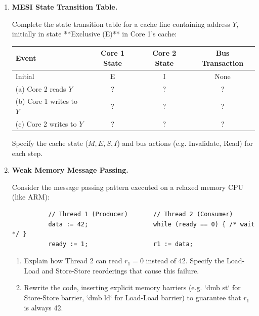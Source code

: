 \documentclass[12pt, a4paper]{book}
\begin{document}
\begin{problembox}
\begin{enumerate}[label=\textbf{P\arabic*.}]
  \item \textbf{MESI State Transition Table.}
  
        Complete the state transition table for a cache line containing address $Y$, initially in state **Exclusive (E)** in Core 1's cache:
        \begin{center}
        \begin{tabular}{lccc}
          \toprule
          \textbf{Event} & \textbf{Core 1 State} & \textbf{Core 2 State} & \textbf{Bus Transaction} \\
          \midrule
          Initial & E & I & None \\
          (a) Core 2 reads $Y$ & ? & ? & ? \\
          (b) Core 1 writes to $Y$ & ? & ? & ? \\
          (c) Core 2 writes to $Y$ & ? & ? & ? \\
          \bottomrule
        \end{tabular}
        \end{center}
        Specify the cache state ($M, E, S, I$) and bus actions (e.g. Invalidate, Read) for each step.

  \item \textbf{Weak Memory Message Passing.}
  
        Consider the message passing pattern executed on a relaxed memory CPU (like ARM):
        \begin{verbatim}
          // Thread 1 (Producer)       // Thread 2 (Consumer)
          data := 42;                  while (ready == 0) { /* wait */ }
          ready := 1;                  r1 := data;
        \end{verbatim}
        \begin{enumerate}[label=(\alph*)]
          \item Explain how Thread 2 can read $r_1 = 0$ instead of 42. Specify the Load-Load and Store-Store reorderings that cause this failure.
          \item Rewrite the code, inserting explicit memory barriers (e.g. `dmb st` for Store-Store barrier, `dmb ld` for Load-Load barrier) to guarantee that $r_1$ is always 42.
        \end{enumerate}
\end{enumerate}
\end{problembox}

\newpage
\end{document}
